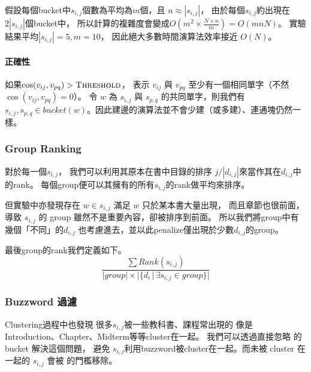 假設每個bucket中$s_{i,j}$個數為平均為$m$個，且 $n\approx |s_{i,j}|$，
由於每個$s_{i,j}$約出現在$2|s_{i,j}|$個bucket中，
所以計算的複雜度會變成$O(m^2\times \frac{N\times n}{m}) = O(mnN)$。
實驗結果平均$|s_{i,j}| = 5,m = 10$，
因此絕大多數時間演算法效率接近 $O(N)$。

\noindent \paragraph{正確性}
如果$\cos(v_{ij},v_{pq})>\text{\textproc{Threshold}}$，
表示 $v_{ij}$ 與 $v_{pq}$ 至少有一個相同單字（不然$\cos(v_{ij},v_{pq})=0$）。
令 $w$ 為 $s_{i,j}$ 與 $s_{p,q}$ 的共同單字，則我們有 $s_{i,j},s_{p,q}\in \mathit{bucket}(w)$。因此建邊的演算法並不會少建（或多建）、連通塊仍然一樣。

\subsubsection{Group Ranking}
對於每一個$s_{i,j}$，
我們可以利用其原本在書中目錄的排序 $j/|d_{i,j}|$來當作其在$d_{i,j}$中的rank。
每個group便可以其擁有的所有$s_{i,j}$的rank做平均來排序。

但實驗中亦發現存在 $w\in s_{i,j}$ 滿足 $w$ 只於某本書大量出現，
而且章節也很前面，導致 $s_{i,j}$ 的 group 雖然不是重要內容，卻被排序到前面。
所以我們將group中有幾個「不同」的$d_{i,j}$ 也考慮進去，並以此penalize僅出現於少數$d_{i,j}$的group。

最後group的rank我們定義如下。
\[ \frac
    {\sum \mathit{Rank}(s_{i,j})}
    {|\mathit{group}|\times |\{d_i \,|\, \exists s_{i,j} \in group\}|} \]

\subsubsection{Buzzword 過濾}
Clustering過程中也發現
很多$s_{i,j}$被一些教科書、課程常出現的  
像是Introduction、Chapter、Midterm等等cluster在一起。
我們可以透過直接忽略  的bucket 解決這個問題，
避免 $s_{i,j}$利用buzzword被cluster在一起。而未被 cluster 在一起的
$s_{i,j}$ 會被  的門檻移除。